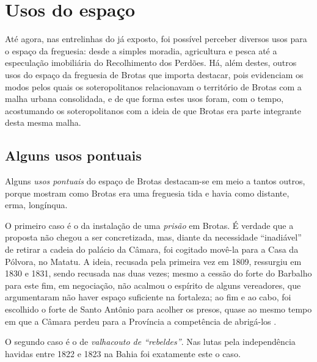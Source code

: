 \section{Usos do espaço}\label{sec:2.4}

Até agora, nas entrelinhas do já exposto, foi possível perceber diversos usos para o espaço da freguesia: desde a simples moradia, agricultura e pesca até a especulação imobiliária do Recolhimento dos Perdões. Há, além destes, outros usos do espaço da freguesia de Brotas que importa destacar, pois evidenciam os modos pelos quais os soteropolitanos relacionavam o território de Brotas com a malha urbana consolidada, e de que forma estes usos foram, com o tempo, acostumando os soteropolitanos com a ideia de que Brotas era parte integrante desta mesma malha.

\subsection{Alguns usos pontuais}

Alguns \textit{usos pontuais} do espaço de Brotas destacam-se em meio a tantos outros, porque mostram como Brotas era uma freguesia tida e havia como distante, erma, longínqua.

O primeiro caso é o da instalação de uma \textit{prisão} em Brotas. É verdade que a proposta não chegou a ser concretizada, mas, diante da necessidade ``inadiável'' de retirar a cadeia do palácio da Câmara, foi cogitado movê-la para a Casa da Pólvora, no Matatu. A ideia, recusada pela primeira vez em 1809, ressurgiu em 1830 e 1831, sendo recusada nas duas vezes; mesmo a cessão do forte do Barbalho para este fim, em negociação, não acalmou o espírito de alguns vereadores, que argumentaram não haver espaço suficiente na fortaleza; ao fim e ao cabo, foi escolhido o forte de Santo Antônio para acolher os presos, quase ao mesmo tempo em que a Câmara perdeu para a Província a competência de abrigá-los \cite[pp.~304-305]{ruy_camara_1953}.

O segundo caso é o de \textit{valhacouto de ``rebeldes''}. Nas lutas pela independência havidas entre 1822 e 1823 na Bahia foi exatamente este o caso. 

